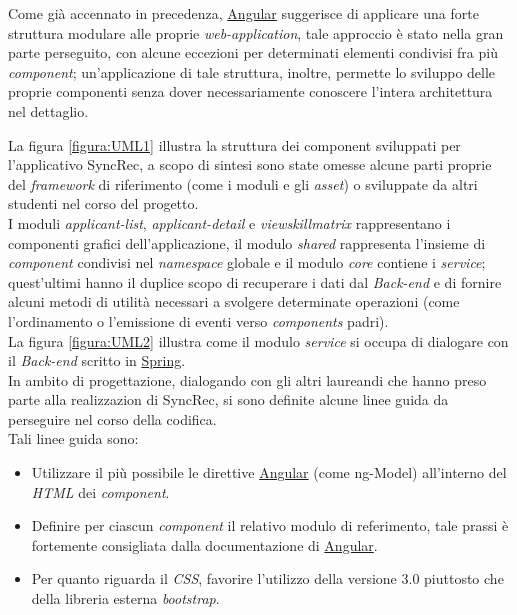 Come già accennato in precedenza, \hyperref[angular]{Angular} suggerisce di applicare una forte struttura modulare alle proprie \textit{web-application}, tale approccio è stato nella gran parte perseguito, con alcune eccezioni per determinati elementi condivisi fra più \textit{component}; un'applicazione di tale struttura, inoltre, permette lo sviluppo delle proprie componenti senza dover necessariamente conoscere l'intera architettura nel dettaglio.

La figura \ref{figura:UML1} illustra la struttura dei component sviluppati per l'applicativo SyncRec, a scopo di sintesi sono state omesse alcune parti proprie del \textit{framework} di riferimento (come i moduli e gli \textit{asset}) o sviluppate da altri studenti nel corso del progetto.\\
I moduli \textit{applicant-list}, \textit{applicant-detail} e \textit{viewskillmatrix} rappresentano i componenti grafici dell'applicazione, il modulo \textit{shared} rappresenta l'insieme di \textit{component} condivisi nel \textit{namespace} globale e il modulo \textit{core} contiene i \textit{service}; quest'ultimi hanno il duplice scopo di recuperare i dati dal \textit{Back-end} e di fornire alcuni metodi di utilità necessari a svolgere determinate operazioni (come l'ordinamento o l'emissione di eventi verso \textit{components} padri).\\
La figura \ref{figura:UML2} illustra come il modulo \textit{service} si occupa di dialogare con il \textit{Back-end} scritto in \hyperref[tech-spring]{Spring}.\\
In ambito di progettazione, dialogando con gli altri laureandi che hanno preso parte alla realizzazion di SyncRec, si sono definite alcune linee guida da perseguire nel corso della codifica.\\
Tali linee guida sono:
\begin{itemize}
	\item Utilizzare il più possibile le direttive \hyperref[angular]{Angular} (come \gls{ng-Model}) all'interno del \textit{HTML} dei \textit{component}.
	\item Definire per ciascun \textit{component} il relativo modulo di referimento, tale prassi è fortemente consigliata dalla documentazione di \hyperref[angular]{Angular}.
	\item Per quanto riguarda il \textit{CSS}, favorire l'utilizzo della versione 3.0 piuttosto che della libreria esterna \textit{bootstrap}.
\end{itemize}

